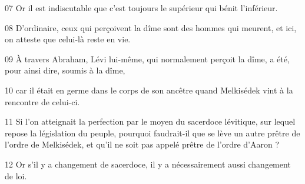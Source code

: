 
07 Or il est indiscutable que c’est toujours le supérieur qui bénit l’inférieur.

08 D’ordinaire, ceux qui perçoivent la dîme sont des hommes qui meurent, et ici, on atteste que celui-là reste en vie.

09 À travers Abraham, Lévi lui-même, qui normalement perçoit la dîme, a été, pour ainsi dire, soumis à la dîme,

10 car il était en germe dans le corps de son ancêtre quand Melkisédek vint à la rencontre de celui-ci.

11 Si l’on atteignait la perfection par le moyen du sacerdoce lévitique, sur lequel repose la législation du peuple, pourquoi faudrait-il que se lève un autre prêtre de l’ordre de Melkisédek, et qu’il ne soit pas appelé prêtre de l’ordre d’Aaron ?

12 Or s’il y a changement de sacerdoce, il y a nécessairement aussi changement de loi.
